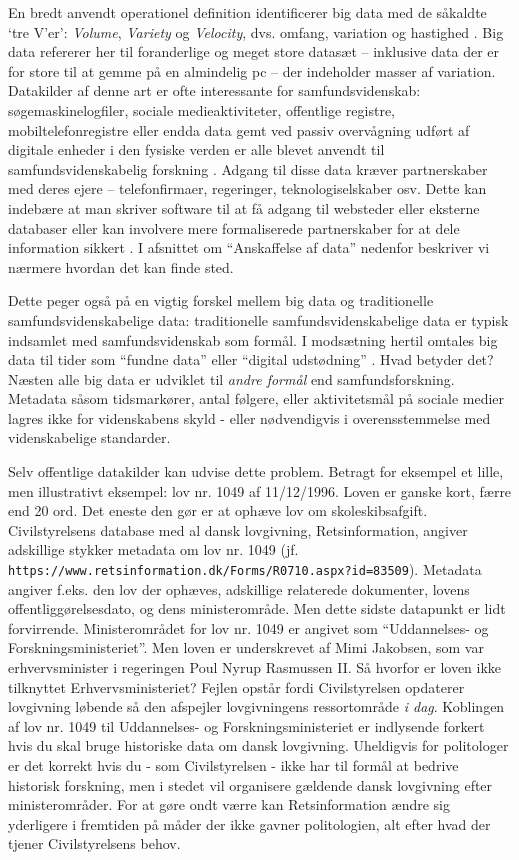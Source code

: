 \documentclass[12pt,]{article}
\begin{document}
En bredt anvendt operationel definition identificerer big data med de
såkaldte `tre V'er': \emph{Volume}, \emph{Variety} og \emph{Velocity},
dvs. omfang, variation og hastighed \citep{laney01}. Big data refererer
her til foranderlige og meget store datasæt -- inklusive data der er for
store til at gemme på en almindelig pc -- der indeholder masser af
variation. Datakilder af denne art er ofte interessante for
samfundsvidenskab: søgemaskinelogfiler, sociale medieaktiviteter,
offentlige registre, mobiltelefonregistre eller endda data gemt ved
passiv overvågning udført af digitale enheder i den fysiske verden er
alle blevet anvendt til samfundsvidenskabelig forskning
\citep{salganik17}. Adgang til disse data kræver partnerskaber med deres
ejere -- telefonfirmaer, regeringer, teknologiselskaber osv. Dette kan
indebære at man skriver software til at få adgang til websteder eller
eksterne databaser eller kan involvere mere formaliserede partnerskaber
for at dele information sikkert \citep{EL14}. I afsnittet om
``Anskaffelse af data'' nedenfor beskriver vi nærmere hvordan det kan
finde sted.

Dette peger også på en vigtig forskel mellem big data og traditionelle
samfundsvidenskabelige data: traditionelle samfundsvidenskabelige data
er typisk indsamlet med samfundsvidenskab som formål. I modsætning
hertil omtales big data til tider som ``fundne data'' eller ``digital
udstødning'' \citep{harford14}. Hvad betyder det? Næsten alle big data
er udviklet til \emph{andre formål} end samfundsforskning. Metadata
såsom tidsmarkører, antal følgere, eller aktivitetsmål på sociale medier
lagres ikke for videnskabens skyld - eller nødvendigvis i
overensstemmelse med videnskabelige standarder.

Selv offentlige datakilder kan udvise dette problem. Betragt for
eksempel et lille, men illustrativt eksempel: lov nr. 1049 af
11/12/1996. Loven er ganske kort, færre end 20 ord. Det eneste den gør
er at ophæve lov om skoleskibsafgift. Civilstyrelsens database med al
dansk lovgivning, Retsinformation, angiver adskillige stykker metadata
om lov nr. 1049 (jf.
\texttt{https://www.retsinformation.dk/Forms/R0710.aspx?id=83509}).
Metadata angiver f.eks. den lov der ophæves, adskillige relaterede
dokumenter, lovens offentliggørelsesdato, og dens ministerområde. Men
dette sidste datapunkt er lidt forvirrende. Ministerområdet for lov nr.
1049 er angivet som ``Uddannelses- og Forskningsministeriet''. Men loven
er underskrevet af Mimi Jakobsen, som var erhvervsminister i regeringen
Poul Nyrup Rasmussen II. Så hvorfor er loven ikke tilknyttet
Erhvervsministeriet? Fejlen opstår fordi Civilstyrelsen opdaterer
lovgivning løbende så den afspejler lovgivningens ressortområde \emph{i
dag}. Koblingen af lov nr. 1049 til Uddannelses- og
Forskningsministeriet er indlysende forkert hvis du skal bruge
historiske data om dansk lovgivning. Uheldigvis for politologer er det
korrekt hvis du - som Civilstyrelsen - ikke har til formål at bedrive
historisk forskning, men i stedet vil organisere gældende dansk
lovgivning efter ministerområder. For at gøre ondt værre kan
Retsinformation ændre sig yderligere i fremtiden på måder der ikke
gavner politologien, alt efter hvad der tjener Civilstyrelsens behov.
\end{document}
